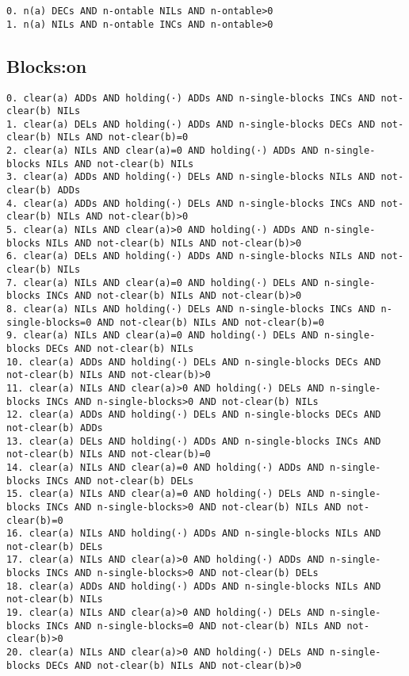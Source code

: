 \documentclass[a4paper]{article}
\begin{document}
\begin{Verbatim}[fontsize=\footnotesize]
0. n(a) DECs AND n-ontable NILs AND n-ontable>0
1. n(a) NILs AND n-ontable INCs AND n-ontable>0
\end{Verbatim}


\subsection{Blocks:on}
\begin{Verbatim}[fontsize=\footnotesize]
0. clear(a) ADDs AND holding(·) ADDs AND n-single-blocks INCs AND not-clear(b) NILs
1. clear(a) DELs AND holding(·) ADDs AND n-single-blocks DECs AND not-clear(b) NILs AND not-clear(b)=0
2. clear(a) NILs AND clear(a)=0 AND holding(·) ADDs AND n-single-blocks NILs AND not-clear(b) NILs
3. clear(a) ADDs AND holding(·) DELs AND n-single-blocks NILs AND not-clear(b) ADDs
4. clear(a) ADDs AND holding(·) DELs AND n-single-blocks INCs AND not-clear(b) NILs AND not-clear(b)>0
5. clear(a) NILs AND clear(a)>0 AND holding(·) ADDs AND n-single-blocks NILs AND not-clear(b) NILs AND not-clear(b)>0
6. clear(a) DELs AND holding(·) ADDs AND n-single-blocks NILs AND not-clear(b) NILs
7. clear(a) NILs AND clear(a)=0 AND holding(·) DELs AND n-single-blocks INCs AND not-clear(b) NILs AND not-clear(b)>0
8. clear(a) NILs AND holding(·) DELs AND n-single-blocks INCs AND n-single-blocks=0 AND not-clear(b) NILs AND not-clear(b)=0
9. clear(a) NILs AND clear(a)=0 AND holding(·) DELs AND n-single-blocks DECs AND not-clear(b) NILs
10. clear(a) ADDs AND holding(·) DELs AND n-single-blocks DECs AND not-clear(b) NILs AND not-clear(b)>0
11. clear(a) NILs AND clear(a)>0 AND holding(·) DELs AND n-single-blocks INCs AND n-single-blocks>0 AND not-clear(b) NILs
12. clear(a) ADDs AND holding(·) DELs AND n-single-blocks DECs AND not-clear(b) ADDs
13. clear(a) DELs AND holding(·) ADDs AND n-single-blocks INCs AND not-clear(b) NILs AND not-clear(b)=0
14. clear(a) NILs AND clear(a)=0 AND holding(·) ADDs AND n-single-blocks INCs AND not-clear(b) DELs
15. clear(a) NILs AND clear(a)=0 AND holding(·) DELs AND n-single-blocks INCs AND n-single-blocks>0 AND not-clear(b) NILs AND not-clear(b)=0
16. clear(a) NILs AND holding(·) ADDs AND n-single-blocks NILs AND not-clear(b) DELs
17. clear(a) NILs AND clear(a)>0 AND holding(·) ADDs AND n-single-blocks INCs AND n-single-blocks>0 AND not-clear(b) DELs
18. clear(a) ADDs AND holding(·) ADDs AND n-single-blocks NILs AND not-clear(b) NILs
19. clear(a) NILs AND clear(a)>0 AND holding(·) DELs AND n-single-blocks INCs AND n-single-blocks=0 AND not-clear(b) NILs AND not-clear(b)>0
20. clear(a) NILs AND clear(a)>0 AND holding(·) DELs AND n-single-blocks DECs AND not-clear(b) NILs AND not-clear(b)>0
\end{Verbatim}
\end{document}
